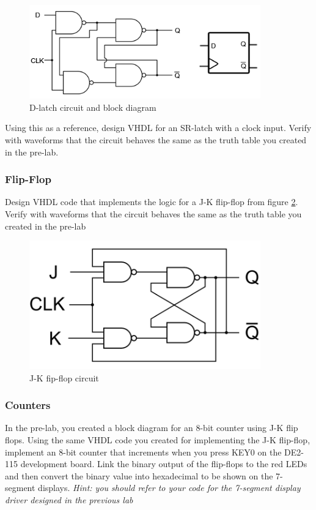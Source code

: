 \begin{figure}[H]
	\centering
	\includegraphics[width=100mm]{Lab2/figures/dlatch.png}
	\caption{D-latch circuit and block diagram}
	\label{fig:dlatch}
\end{figure}

Using this as a reference, design VHDL for an SR-latch with a clock input. Verify with waveforms that the circuit behaves the same as the truth table you created in the pre-lab.


\subsubsection{Flip-Flop}
Design VHDL code that implements the logic for a J-K flip-flop from figure \ref{fig:jkflipflop}. Verify with waveforms that the circuit behaves the same as the truth table you created in the pre-lab 

\begin{figure}[H]
	\centering
	\includegraphics[width=100mm]{Lab2/figures/jkflipflop.png}
	\caption{J-K fip-flop circuit}
	\label{fig:jkflipflop}
\end{figure}

\subsubsection{Counters}
In the pre-lab, you created a block diagram for an 8-bit counter using J-K flip flops. Using the same VHDL code you created for implementing the J-K flip-flop, implement an 8-bit counter that increments when you press KEY0 on the DE2-115 development board. Link the binary output of the flip-flops to the red LEDs and then convert the binary value into hexadecimal to be shown on the 7-segment displays. \emph{Hint: you should refer to your code for the 7-segment display driver designed in the previous lab}

